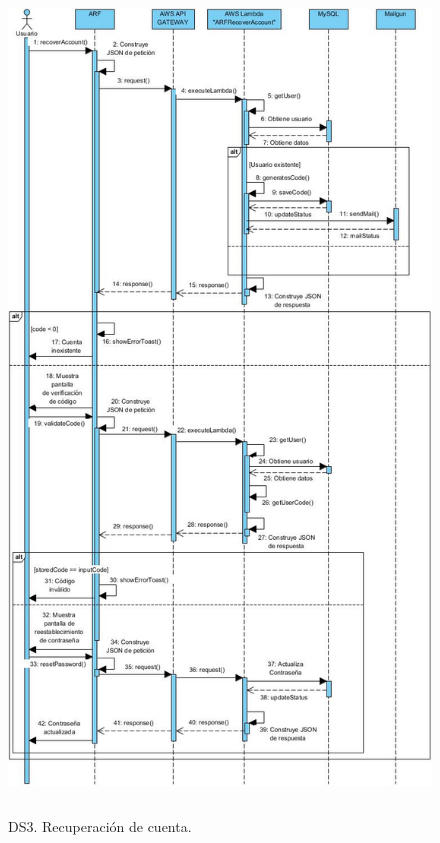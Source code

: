 \begin{figure}[h!]
	\centering
	\includegraphics[width=13cm,height=22cm]{imagenes/analisis/ds/RecCuenta.jpg}
	\caption{DS3. Recuperación de cuenta.}
	\label{fig:dsreccuenta}
\end{figure}
\clearpage

